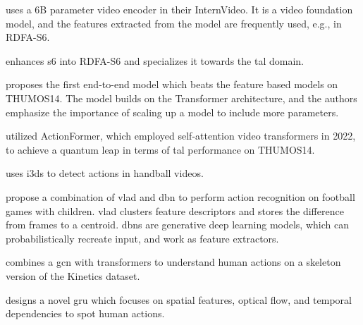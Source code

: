 \textcite{wang_internvideo2_2024} uses a 6B parameter video encoder in their InternVideo. It is a video foundation model, and the features extracted from the model are frequently used, e.g., in RDFA-S6.

\textcite{lee_enhancing_mamba_s6_2024} enhances \acrshort{s6} into RDFA-S6 and specializes it towards the \acrshort{tal} domain. 

\textcite{liu_adatad_2024} proposes the first end-to-end model which beats the feature based models on THUMOS14. The model builds on the Transformer architecture, and the authors emphasize the importance of scaling up a model to include more parameters. 

\textcite{zhang_actionformer_2022} utilized ActionFormer, which employed self-attention video transformers in 2022, to achieve a quantum leap in terms of \acrfull{tal} performance on THUMOS14. 

\textcite{host_handball_2023} uses \acrlong{i3d}s to detect actions in handball videos. 

\textcite{chen_children_2023} propose a combination of \acrfull{vlad} and \acrfull{dbn} to perform action recognition on football games with children. \acrshort{vlad} clusters feature descriptors and stores the difference from frames to a centroid\cite{jegou_vlad_2010}. \acrshort{dbn}s are generative deep learning models, which can probabilistically recreate input, and work as feature extractors\cite{hinton_dbn_2006}.

\textcite{wang_skeleton_two-stream_2023} combines a \acrfull{gcn} with transformers to understand human actions on a skeleton version of the Kinetics dataset.  

\textcite{giveki_human_2024} designs a novel \acrlong{gru} which focuses on spatial features, optical flow, and temporal dependencies to spot human actions. 